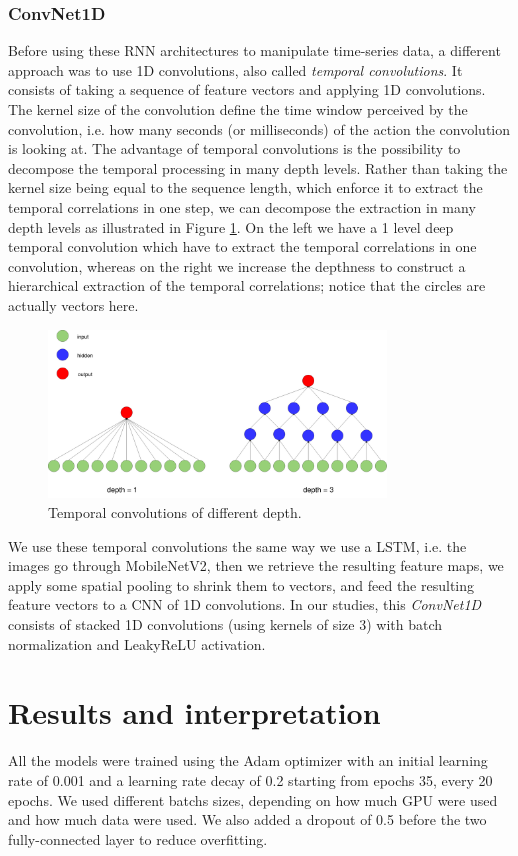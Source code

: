 \documentclass[12pt, a4paper]{report}
\begin{document}
				\subsubsection{ConvNet1D}
					Before using these RNN architectures to manipulate time-series data, a different approach was to use 1D convolutions, also called {\itshape temporal convolutions}.
					It consists of taking a sequence of feature vectors and applying 1D convolutions.
					The kernel size of the convolution define the time window perceived by the convolution, i.e. how many seconds (or milliseconds) of the action the convolution is looking at.
					The advantage of temporal convolutions is the possibility to decompose the temporal processing in many depth levels.
					Rather than taking the kernel size being equal to the sequence length, which enforce it to extract the temporal correlations in one step, we can decompose the extraction in many depth levels as illustrated in Figure \ref{temp_conv}.
					On the left we have a 1 level deep temporal convolution which have to extract the temporal correlations in one convolution, whereas on the right we increase the depthness to construct a hierarchical extraction of the temporal correlations; notice that the circles are actually vectors here.
					\begin{figure}[h!]
						\centering
						\includegraphics[width=0.8\textwidth]{temporal_convolution.png}
						\caption{Temporal convolutions of different depth.}\label{temp_conv}
					\end{figure}
					\par
					We use these temporal convolutions the same way we use a LSTM, i.e. the images go through MobileNetV2, then we retrieve the resulting feature maps, we apply some spatial pooling to shrink them to vectors, and feed the resulting feature vectors to a CNN of 1D convolutions.
					In our studies, this {\itshape ConvNet1D} consists of stacked 1D convolutions (using kernels of size 3) with batch normalization and LeakyReLU activation.
		\section{Results and interpretation}
			All the models were trained using the Adam optimizer with an initial learning rate of 0.001 and a learning rate decay of 0.2 starting from epochs 35, every 20 epochs.
			We used different batchs sizes, depending on how much GPU were used and how much data were used.
			We also added a dropout of 0.5 before the two fully-connected layer to reduce overfitting.
\end{document}
